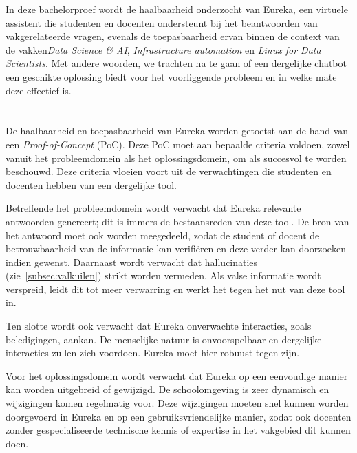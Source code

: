 In deze bachelorproef wordt de haalbaarheid onderzocht van Eureka, een virtuele assistent die studenten en docenten ondersteunt bij het beantwoorden van vakgerelateerde vragen, evenals de toepasbaarheid ervan binnen de context van de vakken\emph{Data Science \& AI}, \emph{Infrastructure automation} en \emph{Linux for Data Scientists}. Met andere woorden, we trachten na te gaan of een dergelijke chatbot een geschikte oplossing biedt voor het voorliggende probleem en in welke mate deze effectief is.
 
\section{}%
\label{sec:onderzoeksdoelstelling}


De haalbaarheid en toepasbaarheid van Eureka worden getoetst aan de hand van een \emph{Proof-of-Concept} (PoC). Deze PoC moet aan bepaalde criteria voldoen, zowel vanuit het probleemdomein als het oplossingsdomein, om als succesvol te worden beschouwd. Deze criteria vloeien voort uit de verwachtingen die studenten en docenten hebben van een dergelijke tool.

Betreffende het probleemdomein wordt verwacht dat Eureka relevante antwoorden genereert; dit is immers de bestaansreden van deze tool. De bron van het antwoord moet ook worden meegedeeld, zodat de student of docent de betrouwbaarheid van de informatie kan verifiëren en deze verder kan doorzoeken indien gewenst. Daarnaast wordt verwacht dat hallucinaties (zie~\ref{subsec:valkuilen}) strikt worden vermeden. Als valse informatie wordt verspreid, leidt dit tot meer verwarring en werkt het tegen het nut van deze tool in.

Ten slotte wordt ook verwacht dat Eureka onverwachte interacties, zoals beledigingen, aankan. De menselijke natuur is onvoorspelbaar en dergelijke interacties zullen zich voordoen. Eureka moet hier robuust tegen zijn.

Voor het oplossingsdomein wordt verwacht dat Eureka op een eenvoudige manier kan worden uitgebreid of gewijzigd. De schoolomgeving is zeer dynamisch en wijzigingen komen regelmatig voor. Deze wijzigingen moeten snel kunnen worden doorgevoerd in Eureka en op een gebruiksvriendelijke manier, zodat ook docenten zonder gespecialiseerde technische kennis of expertise in het vakgebied dit kunnen doen.

